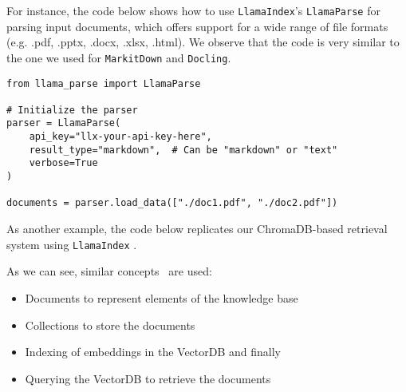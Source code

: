 For instance, the code below shows how to use \texttt{LlamaIndex}'s \texttt{LlamaParse} for parsing input documents, which offers support for a wide range of file formats (e.g. .pdf, .pptx, .docx, .xlsx, .html). We observe that the code is very similar to the one we used for \texttt{MarkitDown} and \texttt{Docling}.

\begin{verbatim}
from llama_parse import LlamaParse

# Initialize the parser
parser = LlamaParse(
    api_key="llx-your-api-key-here",
    result_type="markdown",  # Can be "markdown" or "text"
    verbose=True
)

documents = parser.load_data(["./doc1.pdf", "./doc2.pdf"])
\end{verbatim}
As another example, the code below replicates our ChromaDB-based retrieval system using \texttt{LlamaIndex} .

As we can see, similar concepts~ are used:
\begin{itemize}
\item Documents to represent elements of the knowledge base
\item Collections to store the documents
\item Indexing of embeddings in the VectorDB and finally
\item Querying the VectorDB to retrieve the documents
\end{itemize}

